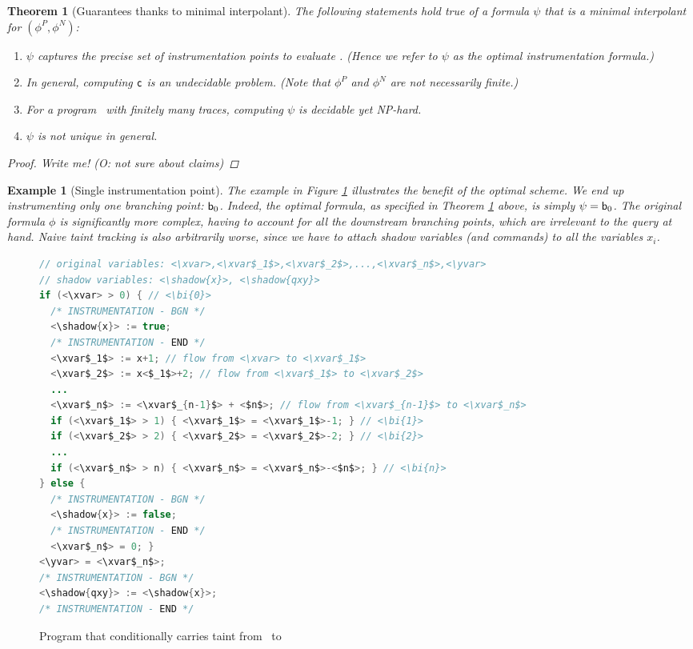 \documentclass[]{article}
\newtheorem{thm}{Theorem}
\newtheorem{ex}{Example}
\begin{document}
\begin{thm}[Guarantees thanks to minimal interpolant]\label{Th:optimal} 
	The following statements hold true of a formula $\psi$ that is a minimal interpolant for $(\phi^P,\phi^N)$:
	\begin{enumerate}
		\item $\psi$ captures the precise set of instrumentation points to evaluate \query{\xvar}{\yvar}. (Hence we refer to $\psi$ as the \emph{optimal instrumentation formula}.)
		\item In general, computing ${\sf c}$ is an undecidable problem. (Note that $\phi^P$ and $\phi^N$ are not necessarily finite.)
		\item For a program \prog\ with finitely many traces, computing $\psi$ is decidable yet NP-hard.
		\item $\psi$ is not unique in general.
	\end{enumerate}
	\begin{proof}
		Write me! (O: not sure about claims)
	\end{proof}
\end{thm}

\newcommand{\bi}[1]{\textnormal{${\sf b}_{#1}$}}

\begin{ex}[Single instrumentation point] The example in Figure \ref{Fi:example} illustrates the benefit of the optimal scheme. We end up instrumenting only one branching point: \bi{0}. Indeed, the optimal formula, as specified in Theorem \ref{Th:optimal} above, is simply $\psi = \bi{0}$. The original formula $\phi$ is significantly more complex, having to account for all the downstream branching points, which are irrelevant to the query at hand. Naive taint tracking is also arbitrarily worse, since we have to attach shadow variables (and commands) to all the variables $x_i$.
\end{ex}

\begin{figure}
\begin{lstlisting}[language=Java,escapeinside={<>}]
// original variables: <\xvar>,<\xvar$_1$>,<\xvar$_2$>,...,<\xvar$_n$>,<\yvar>
// shadow variables: <\shadow{x}>, <\shadow{qxy}>
if (<\xvar> > 0) { // <\bi{0}>
  /* INSTRUMENTATION - BGN */
  <\shadow{x}> := true;
  /* INSTRUMENTATION - END */
  <\xvar$_1$> := x+1; // flow from <\xvar> to <\xvar$_1$>
  <\xvar$_2$> := x<$_1$>+2; // flow from <\xvar$_1$> to <\xvar$_2$>
  ...
  <\xvar$_n$> := <\xvar$_{n-1}$> + <$n$>; // flow from <\xvar$_{n-1}$> to <\xvar$_n$> 
  if (<\xvar$_1$> > 1) { <\xvar$_1$> = <\xvar$_1$>-1; } // <\bi{1}>
  if (<\xvar$_2$> > 2) { <\xvar$_2$> = <\xvar$_2$>-2; } // <\bi{2}>
  ...
  if (<\xvar$_n$> > n) { <\xvar$_n$> = <\xvar$_n$>-<$n$>; } // <\bi{n}>       
} else {
  /* INSTRUMENTATION - BGN */
  <\shadow{x}> := false;
  /* INSTRUMENTATION - END */
  <\xvar$_n$> = 0; }
<\yvar> = <\xvar$_n$>;
/* INSTRUMENTATION - BGN */
<\shadow{qxy}> := <\shadow{x}>;
/* INSTRUMENTATION - END */
\end{lstlisting}
\caption{\label{Fi:example}Program that conditionally carries taint from \xvar\ to \yvar}
\end{figure}
\end{document}
